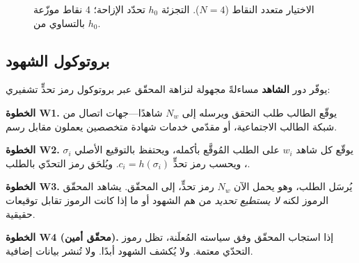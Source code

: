 \documentclass[11pt,a4paper,twocolumn]{article}
\begin{document}
\begin{figure}[ht]
\centering
{}
\caption{الاختيار متعدد النقاط ($N{=}4$). التجزئة $h_0$ تحدّد الإزاحة؛ 4 نقاط موزّعة بالتساوي من $h_0$.}
\label{fig:multipoint}
\end{figure}

\subsection{بروتوكول الشهود}

يوفّر دور \textbf{الشاهد} مساءلةً مجهولة لنزاهة المحقّق عبر بروتوكول رمز تحدٍّ تشفيري:

\textbf{الخطوة W1.} يوقّع الطالب طلب التحقق ويرسله إلى $N_w$ شاهدًا---جهات اتصال من شبكة الطالب الاجتماعية، أو مقدّمي خدمات شهادة متخصصين يعملون مقابل رسم.

\textbf{الخطوة W2.} يوقّع كل شاهد $w_i$ على الطلب المُوقَّع بأكمله، ويحتفظ بالتوقيع الأصلي $\sigma_i$، ويحسب رمز تحدٍّ $c_i = h(\sigma_i)$. ويُلحَق رمز التحدّي بالطلب.

\textbf{الخطوة W3.} يُرسَل الطلب، وهو يحمل الآن $N_w$ رمز تحدٍّ، إلى المحقّق. يشاهد المحقّق الرموز لكنه \emph{لا يستطيع تحديد} من هم الشهود أو ما إذا كانت الرموز تقابل توقيعات حقيقية.

\textbf{الخطوة W4 (محقّق أمين).} إذا استجاب المحقّق وفق سياسته المُعلَنة، تظل رموز التحدّي معتمة. ولا يُكشف الشهود أبدًا. ولا تُنشر بيانات إضافية.
\end{document}
